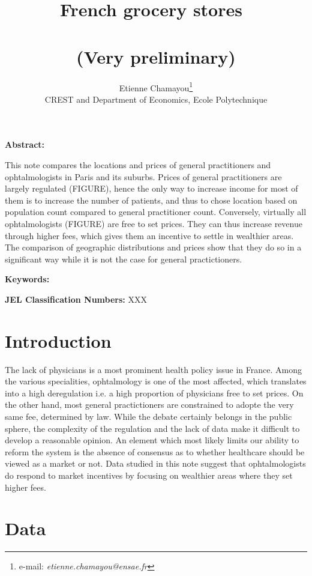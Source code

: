 \documentclass[11pt]{article}
\begin{document}
\title{French grocery stores\ \\ \ \\(Very preliminary)}
\author{Etienne Chamayou\thanks{e-mail:
\textit{etienne.chamayou@ensae.fr}}\medskip\\{\normalsize CREST and Department of Economics, Ecole Polytechnique }}
\maketitle

\sloppy%

\onehalfspacing

\textbf{Abstract:}

This note compares the locations and prices of general practitioners and ophtalmologists in Paris and its suburbs. Prices of general practitioners are largely regulated (FIGURE), hence the only way to increase income for most of them is to increase the number of patients, and thus to chose location based on population count compared to general practitioner count. Conversely, virtually all ophtalmologists (FIGURE) are free to set prices. They can thus increase revenue through higher fees, which gives them an incentive to settle in wealthier areas. The comparison of geographic distributions and prices show that they do so in a significant way while it is not the case for general practictioners.

\strut

\textbf{Keywords:}

\strut

\textbf{JEL Classification Numbers:} XXX

\pagebreak%
\doublespacing

\section{Introduction}

The lack of physicians is a most prominent health policy issue in France. Among the various specialities, ophtalmology is one of the most affected, which translates into a high deregulation i.e. a high proportion of physicians free to set prices. On the other hand, most general practictioners are constrained to adopte the very same fee, determined by law. While the debate certainly belongs in the public sphere, the complexity of the regulation and the lack of data make it difficult to develop a reasonable opinion. An element which most likely limits our ability to reform the system is the absence of consensus as to whether healthcare should be viewed as a market or not. Data studied in this note suggest that ophtalmologists do respond to market incentives by focusing on wealthier areas where they set higher fees.

\section{Data}


\clearpage

\appendix
\end{document}
